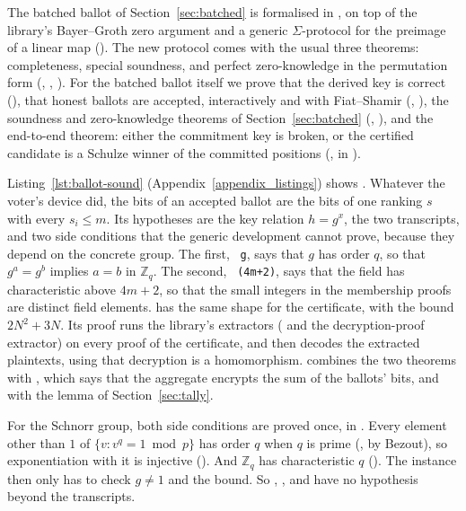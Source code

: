 The batched ballot of Section~\ref{sec:batched} is formalised in
, on top
of the library's Bayer--Groth zero argument and a generic
$\Sigma$-protocol for the preimage of a linear map
(). The new
protocol comes with the usual three theorems: completeness, special
soundness, and perfect zero-knowledge in the permutation form
(, , ). For
the batched ballot itself we prove that the derived key is correct
(), that honest ballots are accepted, interactively and
with Fiat--Shamir (, ),
the soundness and zero-knowledge theorems of Section~\ref{sec:batched}
(, ), and the end-to-end theorem:
either the commitment key is broken, or the certified candidate is a
Schulze winner of the committed positions (,
in ).

Listing~\ref{lst:ballot-sound} (Appendix~\ref{appendix_listings}) shows
. Whatever the
voter's device did, the bits of an accepted ballot are the bits of one
ranking $s$ with every $s_i \le m$. Its hypotheses are the key relation $h = g^x$, the two
transcripts, and two side conditions that the generic development cannot
prove, because they depend on the concrete group. The first,
~\texttt{g}, says that $g$ has order $q$, so that
$g^a = g^b$ implies $a = b$ in $\mathbb{Z}_q$. The second,
~\texttt{(4m+2)}, says that the field has
characteristic above $4m+2$, so that the small integers in the
membership proofs are distinct field elements.
 has the same shape for the certificate, with
the bound $2N^2 + 3N$. Its proof runs the library's extractors
( and the decryption-proof
extractor) on every proof of the certificate, and then decodes the
extracted plaintexts, using that decryption is a homomorphism.
 combines the two theorems with
, which says that the aggregate encrypts the sum of
the ballots' bits, and with the lemma of Section~\ref{sec:tally}.

For the Schnorr group, both side conditions are proved once, in
. Every
element other than $1$ of $\{v : v^q = 1 \bmod p\}$ has order $q$ when
$q$ is prime (, by Bezout), so exponentiation with it
is injective (). And $\mathbb{Z}_q$ has
characteristic $q$ (). The instance then
only has to check $g \ne 1$ and the bound. So ,
, and  have no
hypothesis beyond the transcripts.

